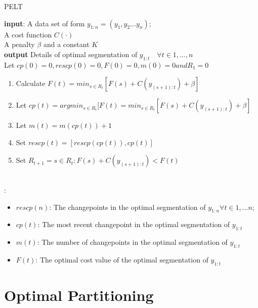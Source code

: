 \documentclass{article}
\newcommand\tab[1][0.4cm]{\hspace*{#1}}
\begin{document}
\begin{algorithm}
\caption{PELT}\label{alg:cap}

\textbf{input}: A data set of form $y_{1:n} = (y_{1},y_{2}...y_{n})$;\\
\qquad  A cost function $C(\cdot)$\\
\qquad A penalty $\beta$ and a constant $K$ \\
\textbf{output} Details of optimal segmentation of $y_{1:t} \quad \forall
t \in {1,...,n}$ \\
\tab Let $cp(0) = 0,rescp(0) = 0, F(0) = 0, m(0) = 0 and R_{1} = {0}$
\begin{algorithmic}
    \begin{enumerate}
        \item Calculate $F(t) = min_{s\in R_{t}} [F(s) + C(y_{(s+1) : t}) + \beta]$
        \item Let $cp(t) = argmin_{s\in R_{t}}{[F(t) = min_{s\in R_{t}} [F(s) + C(y_{(s+1) : t}) + \beta]}$
        \item Let $ m(t) = m(cp(t)) + 1$
        \item Set $rescp(t) = [rescp(cp(t)),cp(t)]$
        \item Set $R_{t+1} = {s \in R_{t} : F(s) + C(y_{(s+1) : t}) < F(t)}$
    \end{enumerate}
\EndFor\\
\Return : 
    \begin{itemize}
        \item $rescp(n)$: The changepoints in the optimal segmentation of $y_{1:n} \forall t \in {1,...n}$; 
        \item $cp(t)$: The most recent changepoint in the optimal segmentation of $y_{1:t}$
        \item $m(t)$: The number of changepoints in the optimal segmentation of $y_{1:t}$
        \item $F(t)$: The optimal cost value of the optimal segmentation of $y_{1:t}$
    \end{itemize}
\end{algorithmic}
\end{algorithm}


\section{Optimal Partitioning}
\end{document}
